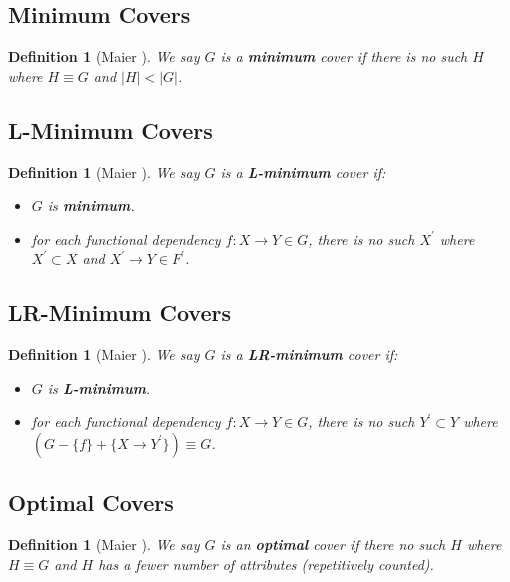\documentclass[11pt]{book}
\newtheorem{mydef}[thm]{Definition}
\begin{document}
\subsection{Minimum Covers}

\begin{mydef}[Maier \cite{maier1980minimum}]
We say $G$ is a \textbf{minimum} cover if there is no such $H$ where $H \equiv G$ and $\lvert H \rvert < \lvert G \rvert$.
\end{mydef}

\subsection{L-Minimum Covers}

\begin{mydef}[Maier \cite{maier1980minimum}]
We say $G$ is a \textbf{L-minimum} cover if:
  \begin{itemize}
  	\item $G$ is \textbf{minimum}.
  	\item for each functional dependency $f: X \rightarrow Y \in G$, there is no such $X^{'}$ where $X^{'} \subset X$ and $X^{'} \rightarrow Y \in F^{'}$.
  \end{itemize}
\end{mydef}

\subsection{LR-Minimum Covers}

\begin{mydef}[Maier \cite{maier1980minimum}]
We say $G$ is a \textbf{LR-minimum} cover if:
  \begin{itemize}
  	\item $G$ is \textbf{L-minimum}.
  	\item for each functional dependency $f: X \rightarrow Y \in G$, there is no such $Y^{'} \subset Y$ where $(G - \{f\} + \{X \rightarrow Y^{'}\}) \equiv G$.
  \end{itemize}
\end{mydef}

\subsection{Optimal Covers}

\begin{mydef}[Maier \cite{maier1980minimum}]
We say $G$ is an \textbf{optimal} cover if there no such $H$ where $H \equiv G$ and $H$ has a fewer number of attributes (repetitively counted).
\end{mydef}
\end{document}
